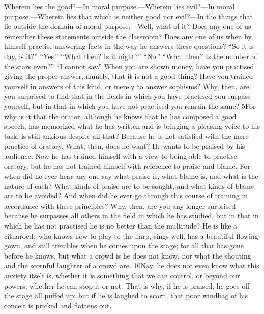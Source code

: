 Wherein lies the good?—In moral purpose.—Wherein lies evil?—In moral purpose.—Wherein lies that which is neither good nor evil?—In the things that lie outside the domain of moral purpose.—Well, what of it? Does any one of us remember these statements outside the classroom? Does any one of us when by himself practise answering facts in the way he answers these questions? ``So it is day, is it?'' ``Yes.'' ``What then? Is it night?'' ``No.'' ``What then? Is the number of the stars even?'' ``I cannot say.'' When you are shown money, have you practised giving the proper answer, namely, that it is not a good thing? Have you trained yourself in answers of this kind, or merely to answer sophisms? Why, then, are you surprised to find that in the fields in which you have practised you surpass yourself, but in that in which you have not practised you remain the same? 5For why is it that the orator, although he knows that he has composed a good speech, has memorized what he has written and is bringing a pleasing voice to his task, is still anxious despite all that? Because he is not satisfied with the mere practice of oratory. What, then, does he want? He wants to be praised by his audience. Now he has trained himself with a view to being able to practise oratory, but he has not trained himself with reference to praise and blame. For when did he ever hear any one say what praise is, what blame is, and what is the nature of each? What kinds of praise are to be sought, and what kinds of blame are to be avoided? And when did he ever go through this course of training in accordance with these principles? Why, then, are you any longer surprised because he surpasses all others in the field in which he has studied, but in that in which he has not practised he is no better than the multitude? He is like a citharoede who knows how to play to the harp, sings well, has a beautiful flowing gown, and still trembles when he comes upon the stage; for all that has gone before he knows, but what a crowd is he does not know, nor what the shouting and the scornful laughter of a crowd are. 10Nay, he does not even know what this anxiety itself is, whether it is something that we can control, or beyond our powers, whether he can stop it or not. That is why, if he is praised, he goes off the stage all puffed up; but if he is laughed to scorn, that poor windbag of his conceit is pricked and flattens out.

